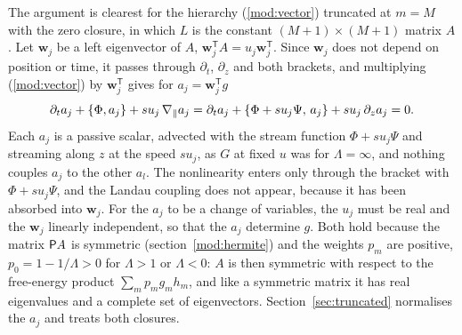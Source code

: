The argument is clearest for the hierarchy (\ref{mod:vector}) truncated at $m=M$ with the zero closure, in which $L$ is the constant $(M+1)\times(M+1)$ matrix $A$. Let $\boldsymbol w_j$ be a left eigenvector of $A$, $\boldsymbol w_j^{\mathsf T}A=u_j\boldsymbol w_j^{\mathsf T}$. Since $\boldsymbol w_j$ does not depend on position or time, it passes through $\partial_t$, $\partial_z$ and both brackets, and multiplying (\ref{mod:vector}) by $\boldsymbol w_j^{\mathsf T}$ gives for $a_j=\boldsymbol w_j^{\mathsf T}g$
\begin{equation*}
  \partial_ta_j+\{\Phi,a_j\}+su_j\,\nabla_\parallel a_j
  =\partial_ta_j+\{\Phi+su_j\Psi,\,a_j\}+su_j\,\partial_za_j=0 .
\end{equation*}
Each $a_j$ is a passive scalar, advected with the stream function $\Phi+su_j\Psi$ and streaming along $z$ at the speed $su_j$, as $G$ at fixed $u$ was for $\Lambda=\infty$, and nothing couples $a_j$ to the other $a_l$. The nonlinearity enters only through the bracket with $\Phi+su_j\Psi$, and the Landau coupling does not appear, because it has been absorbed into $\boldsymbol w_j$. For the $a_j$ to be a change of variables, the $u_j$ must be real and the $\boldsymbol w_j$ linearly independent, so that the $a_j$ determine $g$. Both hold because the matrix $\mathsf P A$ is symmetric (section~\ref{mod:hermite}) and the weights $p_m$ are positive, $p_0=1-1/\Lambda>0$ for $\Lambda>1$ or $\Lambda<0$: $A$ is then symmetric with respect to the free-energy product $\sum_mp_mg_mh_m$, and like a symmetric matrix it has real eigenvalues and a complete set of eigenvectors. Section~\ref{sec:truncated} normalises the $a_j$ and treats both closures.

